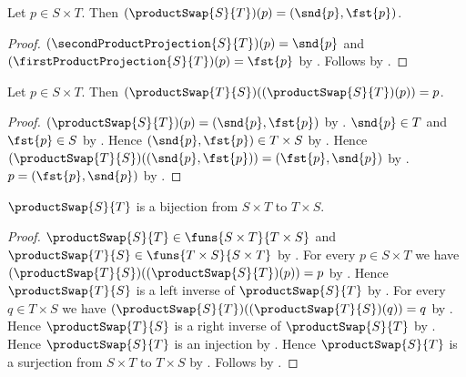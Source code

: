 \begin{proposition}\label{product_swap_apply}
    Let $p\in S\times T$.
    Then $(\productSwap{S}{T})(p)=(\snd{p},\fst{p})$.
\end{proposition}
\begin{proof}
    $(\secondProductProjection{S}{T})(p)=\snd{p}$ and
        $(\firstProductProjection{S}{T})(p)=\fst{p}$ by
        .
    Follows by .
\end{proof}

\begin{proposition}\label{product_swap_involution}
    Let $p\in S\times T$.
    Then $(\productSwap{T}{S})((\productSwap{S}{T})(p))=p$.
\end{proposition}
\begin{proof}
    $(\productSwap{S}{T})(p)=(\snd{p},\fst{p})$ by
        .
    $\snd{p}\in T$ and $\fst{p}\in S$ by
        .
    Hence $(\snd{p},\fst{p})\in T\times S$ by
        .
    Hence $(\productSwap{T}{S})((\snd{p},\fst{p}))
        =(\fst{p},\snd{p})$ by
        .
    $p=(\fst{p},\snd{p})$ by
        .
\end{proof}

\begin{theorem}\label{product_swap_bijection}
    $\productSwap{S}{T}$ is a bijection from $S\times T$ to $T\times S$.
\end{theorem}
\begin{proof}
    $\productSwap{S}{T}\in\funs{S\times T}{T\times S}$ and
        $\productSwap{T}{S}\in\funs{T\times S}{S\times T}$ by
        .
    For every $p\in S\times T$ we have
        $(\productSwap{T}{S})((\productSwap{S}{T})(p))=p$ by
        .
    Hence $\productSwap{T}{S}$ is a left inverse of
        $\productSwap{S}{T}$ by .
    For every $q\in T\times S$ we have
        $(\productSwap{S}{T})((\productSwap{T}{S})(q))=q$ by
        .
    Hence $\productSwap{T}{S}$ is a right inverse of
        $\productSwap{S}{T}$ by .
    Hence $\productSwap{S}{T}$ is an injection by
        .
    Hence $\productSwap{S}{T}$ is a surjection from $S\times T$ to
        $T\times S$ by .
    Follows by .
\end{proof}

